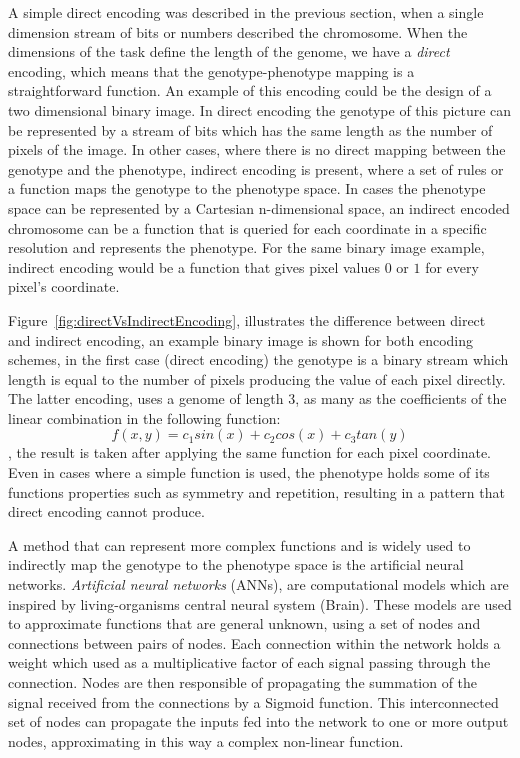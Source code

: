 A simple direct encoding was described in the previous section, when a single dimension stream of bits or numbers described the chromosome. When the dimensions of the task define the length of the genome, we have a \emph{direct} encoding, which means that the genotype-phenotype mapping is a straightforward function. An example of this encoding could be the design of a two dimensional binary image. In direct encoding the genotype of this picture can be represented by a stream of bits which has the same length as the number of pixels of the image. In other cases, where there is no direct mapping between the genotype and the phenotype, indirect encoding is present, where a set of rules or a function maps the genotype to the phenotype space. In cases the phenotype space can be represented by a Cartesian n-dimensional space, an indirect encoded chromosome can be a function that is queried for each coordinate in a specific resolution and represents the phenotype. For the same binary image example, indirect encoding would be a function that gives pixel values $0$ or $1$ for every pixel's coordinate. 



Figure~\ref{fig:directVsIndirectEncoding}, illustrates the difference between direct and indirect encoding, an example binary image is shown for both encoding schemes, in the first case (direct encoding) the genotype is a binary stream which length is equal to the number of pixels producing the value of each pixel directly. The latter encoding, uses a genome of length 3, as many as the coefficients of the linear combination in the following function: 
\[f(x,y) = c_1 sin(x) + c_2 cos(x) + c_3 tan(y)
\], the result is taken after applying the same function for each pixel coordinate. Even in cases where a simple function is used, the  phenotype holds some of its functions properties such as symmetry and repetition, resulting in a pattern that direct encoding cannot produce.

A method that can represent more complex functions and is widely used to indirectly map the genotype to the phenotype space is the artificial neural networks. \emph{Artificial neural networks} (ANNs), are computational models which are inspired by living-organisms central neural system (Brain). These models are used to approximate functions that are general unknown, using a set of nodes and connections between pairs of nodes. Each connection within the network holds a weight which used as a multiplicative factor of each signal passing through the connection. Nodes are then responsible of propagating the summation of the signal received from the connections by a Sigmoid function. This interconnected set of nodes can propagate the inputs fed into the network to one or more output nodes, approximating in this way a complex non-linear function.


